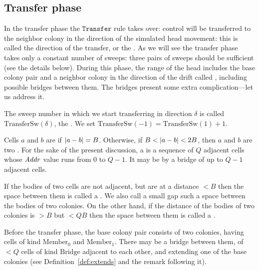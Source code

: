\documentclass[11pt]{memoir}
\theoremstyle{definition} %
\newcommand{\fld}[1]{\ensuremath{\textit{#1\/}}}
\newcommand{\rul}[1]{\ensuremath{\texttt{#1}}}
\def\B{B}
\newcommand{\Q}{Q}
\newcommand{\Addr}{\fld{Addr}}
\newcommand{\Bridge}{\mathrm{Bridge}}
\newcommand{\Member}{\mathrm{Member}}
\newcommand{\TransferSw}{\mathrm{TransferSw}}
\newcommand{\Transfer}{\rul{Transfer}}
\begin{document}
\subsection{Transfer phase}\label{sec:TransferPhase}

In the transfer phase the \( \Transfer \) rule takes over: control will be transferred to the
neighbor colony in the direction of the simulated head movement: this is
called the direction of the transfer, or the .
As we will see the transfer phase takes only a constant number of sweeps:
three pairs of sweeps should be sufficient (see the details below).
During this phase, the range of the head
includes the base colony pair and a neighbor colony
in the direction of the drift called , including possible bridges between them.
The bridges present some extra complication---let us address it.

\begin{sloppypar}
The sweep number in which we start transferring in direction \( \delta \) is called
\( \TransferSw(\delta) \), the .
We set \( \TransferSw(-1) =\TransferSw(1)+1 \).  
\end{sloppypar}

\begin{definition}\label{def:adjacent}
  Cells \( a \) and \( b \) are  if \( \abs{a-b}=\B \).
  Otherwise, if \( \B < \abs{a- b} < 2\B \), then
  \( a \) and \( b \) are two .
For the sake of the present discussion, a  is a sequence of \( \Q \) adjacent
cells whose \( \Addr \) value runs from \( 0 \) to \( \Q-1 \).
It may be  by a bridge of up to \( \Q-1 \) adjacent cells.

If the bodies of two cells are not adjacent, but are at a distance \( <\B \) then the space
between them is called a .
We also call a small gap such a space between the bodies of two colonies.
On the other hand, if the distance of the bodies of two colonies is \( >\B \) 
but \( <\Q\B \) then the space between them is called a .
\end{definition}

Before the transfer phase, the base colony pair consists of two colonies,
having cells of kind \( \Member_{0} \) and \( \Member_{1} \).
There may be a bridge between them, of \( <\Q \) cells of kind \( \Bridge \)
adjacent to each other, and extending one of the base
colonies (see Definition~\ref{def:extends} and the remark following it).
\end{document}
